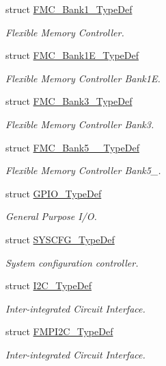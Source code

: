\begin{DoxyCompactItemize}
struct \mbox{\hyperlink{struct_f_m_c___bank1___type_def}{F\+M\+C\+\_\+\+Bank1\+\_\+\+Type\+Def}}
\begin{DoxyCompactList}\small\item\em Flexible Memory Controller. \end{DoxyCompactList}\item 
struct \mbox{\hyperlink{struct_f_m_c___bank1_e___type_def}{F\+M\+C\+\_\+\+Bank1\+E\+\_\+\+Type\+Def}}
\begin{DoxyCompactList}\small\item\em Flexible Memory Controller Bank1E. \end{DoxyCompactList}\item 
struct \mbox{\hyperlink{struct_f_m_c___bank3___type_def}{F\+M\+C\+\_\+\+Bank3\+\_\+\+Type\+Def}}
\begin{DoxyCompactList}\small\item\em Flexible Memory Controller Bank3. \end{DoxyCompactList}\item 
struct \mbox{\hyperlink{struct_f_m_c___bank5__6___type_def}{F\+M\+C\+\_\+\+Bank5\+\_\+\_\+\+Type\+Def}}
\begin{DoxyCompactList}\small\item\em Flexible Memory Controller Bank5\+\_. \end{DoxyCompactList}\item 
struct \mbox{\hyperlink{struct_g_p_i_o___type_def}{G\+P\+I\+O\+\_\+\+Type\+Def}}
\begin{DoxyCompactList}\small\item\em General Purpose I/O. \end{DoxyCompactList}\item 
struct \mbox{\hyperlink{struct_s_y_s_c_f_g___type_def}{S\+Y\+S\+C\+F\+G\+\_\+\+Type\+Def}}
\begin{DoxyCompactList}\small\item\em System configuration controller. \end{DoxyCompactList}\item 
struct \mbox{\hyperlink{struct_i2_c___type_def}{I2\+C\+\_\+\+Type\+Def}}
\begin{DoxyCompactList}\small\item\em Inter-\/integrated Circuit Interface. \end{DoxyCompactList}\item 
struct \mbox{\hyperlink{struct_f_m_p_i2_c___type_def}{F\+M\+P\+I2\+C\+\_\+\+Type\+Def}}
\begin{DoxyCompactList}\small\item\em Inter-\/integrated Circuit Interface. \end{DoxyCompactList}\item 

\end{DoxyCompactItemize}
